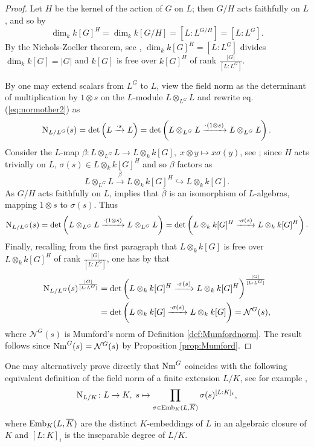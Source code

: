 \documentclass[12pt]{amsart}
\theoremstyle{definition}
\begin{document}
\begin{proof}
	Let $H$ be the kernel of the action of $G$ on $L$; then $G/H$ acts faithfully on $L$, and so by \cite[8.3.7]{MR1243637} 
	\[
	\dim_k k[G]^H=\dim_k k[G/H]= [L{:}L^{G/H}]=[L{:}L^G].
	\]
	By the Nichols-Zoeller theorem, see \cite[3.1.5]{MR1243637}, $\dim_k k[G]^H=[L{:}L^G]$ divides $\dim_kk[G]=|G|$ and $k[G]$ is free over $k[G]^H$ of rank $\frac{|G|}{[L{:}L^G]}$.
	
	By \cite[III.\S 9.1.(12)]{zbMATH05069335} one may extend scalars from $L^G$ to $L$, view the field norm as the determinant of multiplication by $1 \otimes s$ on the $L$-module $L \otimes_{L^G} L$ and rewrite eq. (\ref{eq:normother2}) as
	\[
	{\rm N}_{L/L^G}(s)=
	\det\left(L\xrightarrow{\cdot s} L\right)
	=
	\det \left( L \otimes_{L^G} L \xrightarrow{\cdot (1 \otimes s)} L \otimes_{L^G} L \right).
	\]
	Consider the $L$-map
	$
	{\beta}: L \otimes_{L^G} L \longrightarrow L \otimes_k k[G], \; x \otimes y \longmapsto x\sigma(y)
	$, see  \cite[8.1.1]{MR1243637}; since $H$ acts trivially on $L$, $\sigma(s)\in L\otimes_k k[G]^H$ and so $\beta$ factors as 
	\[
	L \otimes_{L^G} L \xrightarrow{\bar{\beta}} L \otimes_k k[G]^H\hookrightarrow L\otimes_k k[G].
	\]
	As $G/H$ acts faithfully on $L$, \cite[8.3.7]{MR1243637} implies that $\bar{\beta}$ is an isomorphism of $L$-algebras, mapping $1 \otimes s$ to $\sigma(s)$. Thus
	\[
	{\rm N}_{L/L^G}(s)
	=
	\det \left( L \otimes_{L^G} L \xrightarrow{\cdot (1 \otimes s)} L \otimes_{L^G} L \right)
	=
	\det \left( L \otimes_k k[G]^H \xrightarrow{\cdot \sigma(s)} L \otimes_k k[G]^H \right).
	\]
	Finally, recalling from the first paragraph that $L \otimes_k k[G]$ is free over $L \otimes_k k[G]^H$ of rank $\frac{|G|}{[L{:}L^G]}$, one has by  \cite[III.\S 8.6.(33)]{zbMATH05069335}  that
	\begin{align*}
	{\rm N}_{L/L^G}(s)^{\frac{|G|}{[L{:}L^G]}}
	&=
	\det \left( L \otimes_k k[G]^H \xrightarrow{\cdot \sigma(s)} L \otimes_k k[G]^H \right)^{\frac{|G|}{[L:L^G]}}\\
	&=
	\det \left( L \otimes_k k[G] \xrightarrow{\cdot \sigma(s)} L \otimes_k k[G] \right)=\mathcal{N}^G(s),
	\end{align*}
	where $\mathcal{N}^G(s)$ is Mumford's norm of Definition \ref{def:Mumfordnorm}. The result follows since ${\rm Nm}^G(s)=\mathcal{N}^G(s)$ by Proposition \ref{prop:Mumford}.
\end{proof}

One may alternatively prove directly that ${\rm Nm}^G$ coincides with the following equivalent definition of the field norm of a finite extension $L/K$,   see for example \cite[VI.\S5]{MR1878556},
\[
{\rm N}_{L/K} \colon L\rightarrow K,\;
s\mapsto
\prod_{\sigma\in{\rm Emb}_K(L,\overline{K})}\sigma(s)^{[L{:}K]_i},
\]
where ${\rm Emb}_K(L,\overline{K})$ are the distinct $K$-embeddings of $L$ in an algebraic closure of $K$ and $[L{:}K]_i$ is the inseparable degree of $L/K$. 
\end{document}
